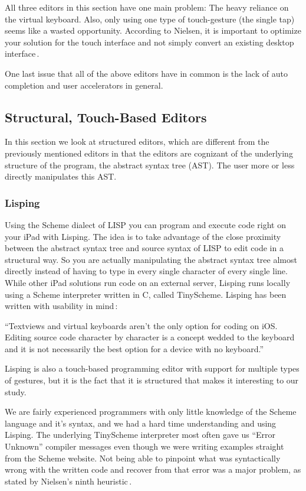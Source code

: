 All three editors in this section have one main problem: The heavy reliance on the virtual keyboard. Also, only using one type of touch-gesture (the single tap) seems like a wasted opportunity.
According to Nielsen, it is important to optimize your solution for the touch
interface and not simply convert an existing desktop interface\,\cite[p 26, p
41]{nielsen2013mobile}.

One last issue that all of the above editors have in common is the lack of auto completion and user accelerators in general.

\subsection{Structural, Touch-Based Editors}
In this section we look at structured editors, which are different from the previously mentioned editors in that the editors are cognizant of the underlying structure of the program, the abstract syntax tree (AST). The user more or less directly manipulates this AST\@.

\subsubsection{Lisping}
\label{subsub:Lisping}
Using the Scheme dialect of LISP you can program and execute code right on your iPad with Lisping. The idea is to take advantage of the close proximity between the abstract syntax tree and source syntax of LISP to edit code in a structural way. So you are actually manipulating the abstract syntax tree almost directly instead of having to type in every single character of every single line. While other iPad solutions run code on an external server, Lisping runs locally using a Scheme interpreter written in C, called TinyScheme. Lisping has been written with usability in mind\,\cite{lisping}: 

``Textviews and virtual keyboards aren't the only option for coding on iOS\@. Editing source code character by character is a concept wedded to the keyboard and it is not necessarily the best option for a device with no keyboard.''

Lisping is also a touch-based programming editor with support for multiple types of gestures, but it is the fact that it is structured that makes it interesting to our study.

We are fairly experienced programmers with only little knowledge of the Scheme language and it's syntax, and we had a hard time understanding and using Lisping. The underlying TinyScheme interpreter most often gave us “Error Unknown” compiler messages even though we were writing examples straight from the Scheme website. Not being able to pinpoint what was syntactically wrong with the written code and recover from that error was a major problem, as stated by Nielsen's ninth heuristic\,\cite{nielsen1990heuristic}.

